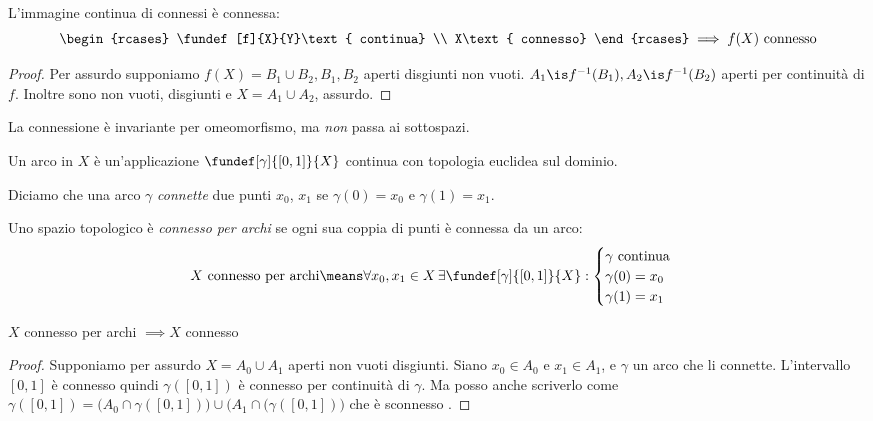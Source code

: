 
\begin{teo}
 L'immagine continua di connessi è connessa:
 \[\begin{rcases}
  \fundef[f]{X}{Y}\text{ continua} \\
  X\text{ connesso}
 \end{rcases}\implies
 f(X)\text{ connesso}\] 
\end{teo}

\begin{proof}
 Per assurdo supponiamo $f(X) = B_1 \cup B_2, B_1,B_2$ aperti disgiunti non vuoti.
 $A_1\is f^{-1}(B_1), A_2\is f^{-1}(B_2)$ aperti per continuità di $f$.
 Inoltre sono non vuoti, disgiunti e $X=A_1\cup A_2$, assurdo.
\end{proof}

\begin{oss}
 La connessione è invariante per omeomorfismo, ma \emph{non} passa ai sottospazi. 
\end{oss}

\begin{defn}[Arco]
 Un arco in $X$ è un'applicazione $\fundef[\gamma]{[0,1]}{X}$ continua con topologia euclidea sul dominio.
\end{defn}

Diciamo che una arco $\gamma$ \emph{connette} due punti $x_0$, $x_1$ se $\gamma(0)=x_0$ e $\gamma(1)=x_1$.

\begin{defn}
 Uno spazio topologico è \emph{connesso per archi} se ogni sua coppia di punti è connessa da un arco:
 \[\text{$X$ connesso per archi}\means
 \forall x_0, x_1 \in X \,\exists \fundef[\gamma]{[0,1]}{X}:\begin{cases}
  \text{$\gamma$ continua} \\
  \gamma(0)=x_0 \\
  \gamma(1)=x_1
 \end{cases}\]
\end{defn}

\begin{prop}
 $X$ connesso per archi $\implies X$ connesso
\end{prop}

\begin{proof}
 Supponiamo per assurdo $X=A_0\cup A_1$ aperti non vuoti disgiunti.
 Siano $x_0\in A_0$ e $x_1\in A_1$,
 e $\gamma$ un arco che li connette.
 L'intervallo $[0,1]$ è connesso quindi $\gamma([0,1])$ è connesso per continuità di $\gamma$.
 Ma posso anche scriverlo come
 $\gamma([0,1])=\big(A_0\cap \gamma([0,1])\big) \cup \big(A_1\cap(\gamma([0,1])\big)$
 che è sconnesso \absurd.
\end{proof}

